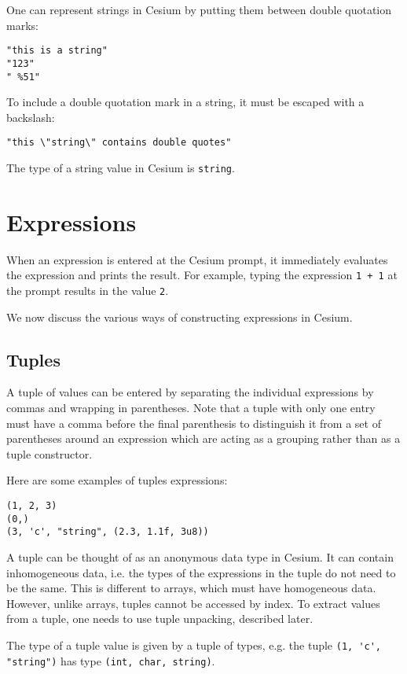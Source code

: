 \documentclass[a4paper,10pt]{article}
\newcommand{\code}{\lstinline}
\begin{document}
One can represent strings in Cesium by putting them between double quotation marks:

\begin{lstlisting}
"this is a string"
"123"
" %51"
\end{lstlisting}

To include a double quotation mark in a string, it must be escaped with a backslash:

\begin{lstlisting}
"this \"string\" contains double quotes"
\end{lstlisting}

The type of a string value in Cesium is \code{string}.

\section{Expressions}

When an expression is entered at the Cesium prompt, it immediately evaluates the 
expression and prints the result. For example, typing the expression \code{1 + 1} at
the prompt results in the value \code{2}.

We now discuss the various ways of constructing expressions in Cesium.

\subsection{Tuples}

A tuple of values can be entered by separating the individual expressions by commas and
wrapping in parentheses. Note that a tuple with only one entry must have a comma before
the final parenthesis to distinguish it from a set of parentheses around an expression
which are acting as a grouping rather than as a tuple constructor.

Here are some examples of tuples expressions:

\begin{lstlisting}
(1, 2, 3)
(0,)
(3, 'c', "string", (2.3, 1.1f, 3u8))
\end{lstlisting}

A tuple can be thought of as an anonymous data type in Cesium. It can contain inhomogeneous
data, i.e. the types of the expressions in the tuple do not need to be the same. This is 
different to arrays, which must have homogeneous data. However, unlike arrays, tuples cannot 
be accessed by index. To extract values from a tuple, one needs to use tuple unpacking, described 
later.

The type of a tuple value is given by a tuple of types, e.g. the tuple \code{(1, 'c', "string")}
has type \code{(int, char, string)}.
\end{document}

